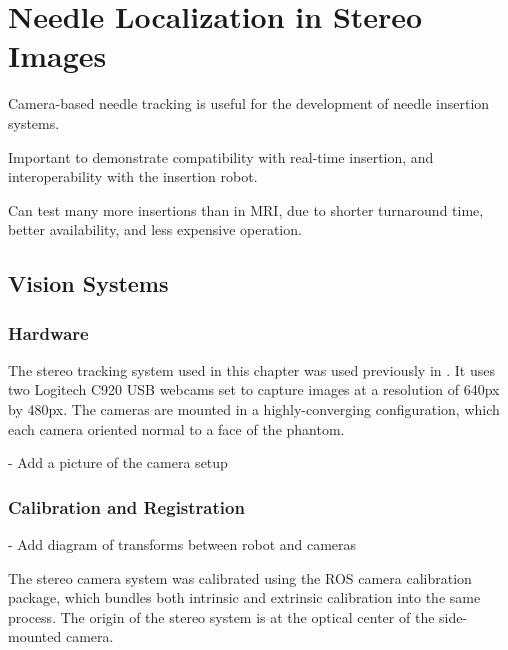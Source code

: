 %
%
%



\chapter{Needle Localization in Stereo Images}
\label{sec:cameratracking} %

Camera-based needle tracking is useful for the development of needle insertion systems.

Important to demonstrate compatibility with real-time insertion, and interoperability with the insertion robot.

Can test many more insertions than in MRI, due to shorter turnaround time, better availability, and less expensive operation.

\section{Vision Systems}
\subsection{Hardware}
The stereo tracking system used in this chapter was used previously in \cite{wartenberg_closed-loop_2017}. It uses two Logitech C920 USB webcams set to capture images at a resolution of 640px by 480px. The cameras are mounted in a highly-converging configuration, which each camera oriented normal to a face of the phantom.

- Add a picture of the camera setup

\subsection{Calibration and Registration}
- Add diagram of transforms between robot and cameras

	The stereo camera system was calibrated using the ROS camera calibration package, which bundles both intrinsic and extrinsic calibration into the same process. The origin of the stereo system is at the optical center of the side-mounted camera.
    
